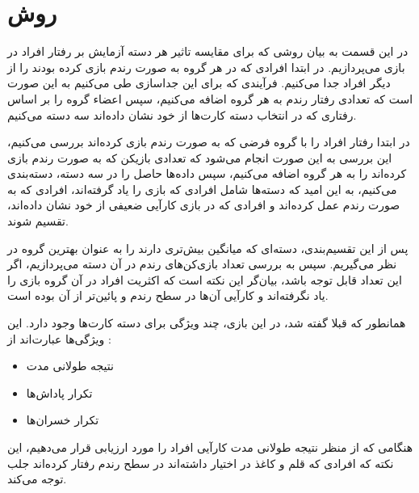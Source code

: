\documentclass{article}
\begin{document}
\section{روش}
در این قسمت به بیان روشی که برای مقایسه تاثیر هر دسته آزمایش  بر رفتار افراد در بازی می‌پردازیم.
در ابتدا افرادی که در هر گروه به صورت رندم بازی کرده بودند را از دیگر افراد جدا می‌کنیم. فرآیندی که برای این جداسازی طی می‌کنیم به این صورت است که 
تعدادی رفتار رندم به هر گروه اضافه می‌کنیم، سپس اعضاء گروه را بر اساس رفتاری که در انتخاب دسته‌ کارت‌ها از خود نشان داده‌اند سه دسته می‌کنیم.

در ابتدا رفتار افراد را با گروه فرضی که به صورت رندم بازی کرده‌اند بررسی می‌کنیم، این بررسی به این صورت انجام می‌شود که 
تعدادی بازیکن که به صورت رندم بازی کرده‌اند را به هر گروه اضافه می‌کنیم، سپس داده‌ها حاصل را در سه دسته، دسته‌بندی می‌کنیم،
به این امید که دسته‌ها شامل افرادی که بازی را یاد گرفته‌اند، افرادی که به صورت رندم عمل کرده‌اند و افرادی که 
در بازی کارآیی ضعیفی از خود نشان داده‌اند، تقسیم شوند.

پس از این تقسیم‌بندی، دسته‌ای که میانگین بیش‌تری دارند را به عنوان بهترین گروه در نظر می‌گیریم.
سپس به بررسی تعداد بازی‌کن‌های رندم در آن دسته می‌پردازیم، اگر 
این تعداد قابل توجه باشد، بیان‌گر این نکته است که اکثریت افراد در آن گروه بازی را یاد نگرفته‌اند
 و کارآیی آن‌ها در سطح رندم و پائین‌تر از آن بوده است.


همانطور که قبلا گفته شد، در این بازی، چند ویژگی برای دسته کارت‌ها وجود دارد. این ویژگی‌ها عبارت‌اند از :
\begin{itemize}
 \item نتیجه طولانی مدت
\item تکرار پاداش‌ها
\item تکرار خسران‌ها
\end{itemize}

هنگامی که از منظر نتیجه طولانی مدت کارآیی افراد را مورد ارزیابی قرار می‌دهیم،
  این نکته که افرادی که قلم و کاغذ در اختیار داشته‌اند
در سطح رندم رفتار کرده‌اند جلب توجه می‌کند.
\end{document}
